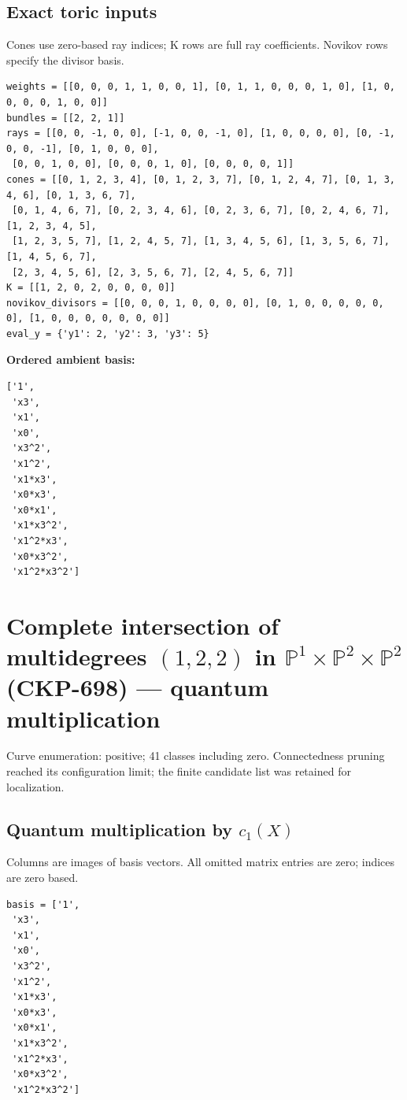 \documentclass[10pt,a4paper]{article}
\begin{document}
\subsection*{Exact toric inputs}
Cones use zero-based ray indices; K rows are full ray coefficients. Novikov rows specify the divisor basis.

\begin{lstlisting}
weights = [[0, 0, 0, 1, 1, 0, 0, 1], [0, 1, 1, 0, 0, 0, 1, 0], [1, 0, 0, 0, 0, 1, 0, 0]]
bundles = [[2, 2, 1]]
rays = [[0, 0, -1, 0, 0], [-1, 0, 0, -1, 0], [1, 0, 0, 0, 0], [0, -1, 0, 0, -1], [0, 1, 0, 0, 0],
 [0, 0, 1, 0, 0], [0, 0, 0, 1, 0], [0, 0, 0, 0, 1]]
cones = [[0, 1, 2, 3, 4], [0, 1, 2, 3, 7], [0, 1, 2, 4, 7], [0, 1, 3, 4, 6], [0, 1, 3, 6, 7],
 [0, 1, 4, 6, 7], [0, 2, 3, 4, 6], [0, 2, 3, 6, 7], [0, 2, 4, 6, 7], [1, 2, 3, 4, 5],
 [1, 2, 3, 5, 7], [1, 2, 4, 5, 7], [1, 3, 4, 5, 6], [1, 3, 5, 6, 7], [1, 4, 5, 6, 7],
 [2, 3, 4, 5, 6], [2, 3, 5, 6, 7], [2, 4, 5, 6, 7]]
K = [[1, 2, 0, 2, 0, 0, 0, 0]]
novikov_divisors = [[0, 0, 0, 1, 0, 0, 0, 0], [0, 1, 0, 0, 0, 0, 0, 0], [1, 0, 0, 0, 0, 0, 0, 0]]
eval_y = {'y1': 2, 'y2': 3, 'y3': 5}
\end{lstlisting}

\textbf{Ordered ambient basis:}
\begin{lstlisting}
['1',
 'x3',
 'x1',
 'x0',
 'x3^2',
 'x1^2',
 'x1*x3',
 'x0*x3',
 'x0*x1',
 'x1*x3^2',
 'x1^2*x3',
 'x0*x3^2',
 'x1^2*x3^2']
\end{lstlisting}

\clearpage\section*{Complete intersection of multidegrees $(1,2,2)$ in $\mathbb P^{1}\times \mathbb P^{2}\times \mathbb P^{2}$ (CKP-698) --- quantum multiplication}

Curve enumeration: positive; 41 classes including zero.
Connectedness pruning reached its configuration limit; the finite candidate list was retained for localization.
\subsection*{Quantum multiplication by $c_1(X)$}
Columns are images of basis vectors. All omitted matrix entries are zero; indices are zero based.

\begin{lstlisting}
basis = ['1',
 'x3',
 'x1',
 'x0',
 'x3^2',
 'x1^2',
 'x1*x3',
 'x0*x3',
 'x0*x1',
 'x1*x3^2',
 'x1^2*x3',
 'x0*x3^2',
 'x1^2*x3^2']
\end{lstlisting}
\end{document}
